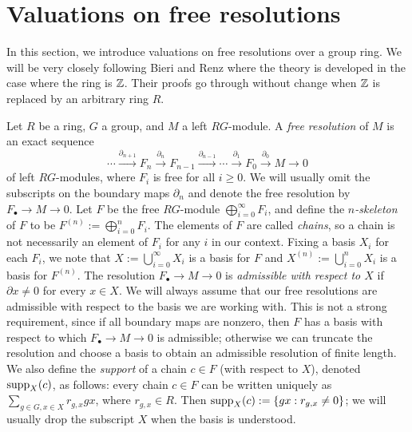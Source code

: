 \documentclass[11pt, letterpaper]{amsart}
\begin{document}
\section{Valuations on free resolutions} \label{sec:valuations}

In this section, we introduce valuations on free resolutions over a group ring. We will be very closely following Bieri and Renz \cite{BieriRenzValutations} where the theory is developed in the case where the ring is $\mathbb{Z}$. Their proofs go through without change when $
\mathbb{Z}$ is replaced by an arbitrary ring $R$.

Let $R$ be a ring, $G$ a group, and $M$ a left $RG$-module. A \textit{free resolution} of $M$ is an exact sequence
\[
    \cdots \xrightarrow{\partial_{n+1}} F_n \xrightarrow{\partial_n} F_{n-1} \xrightarrow{\partial_{n-1}} \cdots \xrightarrow{\partial_1} F_0 \xrightarrow{\partial_0}M \longrightarrow 0
\]
of left $RG$-modules, where $F_i$ is free for all $i \geqslant 0$. We will usually omit the subscripts on the boundary maps $\partial_n$ and denote the free resolution by $F_\bullet \longrightarrow M \longrightarrow 0$. Let $F$ be the free $RG$-module $\bigoplus_{i = 0}^\infty F_i$, and define the \textit{$n$-skeleton} of $F$ to be $F^{(n)} := \bigoplus_{i = 0}^n F_i$. The elements of $F$ are called \textit{chains}, so a chain is not necessarily an element of $F_i$ for any $i$ in our context. Fixing a basis $X_i$ for each $F_i$, we note that $X := \bigcup_{i=0}^\infty X_i$ is a basis for $F$ and $X^{(n)} := \bigcup_{i = 0}^n X_i$ is a basis for $F^{(n)}$. The resolution $F_\bullet \longrightarrow M \longrightarrow 0$ is \textit{admissible with respect to $X$} if $\partial x \neq 0$ for every $x \in X$. We will always assume that our free resolutions are admissible with respect to the basis we are working with. This is not a strong requirement, since if all boundary maps are nonzero, then $F$ has a  basis with respect to which $F_\bullet \longrightarrow M \longrightarrow 0$ is admissible; otherwise we can truncate the resolution and choose a basis to obtain an admissible resolution of finite length. We also define the \textit{support} of a chain $c \in F$ (with respect to $X$), denoted $\operatorname{supp}_X(c)$, as follows: every chain $c \in F$ can be written uniquely as $\sum_{g\in G, x \in X} r_{g,x} gx$, where $r_{g,x} \in R$. Then $\operatorname{supp}_X (c) := \{ gx : r_{g,x} \neq 0 \}$; we will usually drop the subscript $X$ when the basis is understood.
\end{document}
